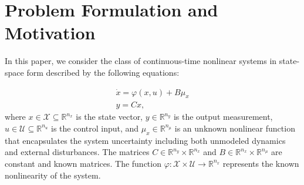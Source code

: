 \documentclass{ifacconf}
\begin{document}










\section{Problem Formulation and Motivation}\label{sec2}
%
In this paper, we consider the class of continuous-time nonlinear systems in state-space form described by the following equations:

\begin{equation}\label{sys_1}
    \begin{array}{l}
        \dot{x} = \varphi(x,u) + B\mu_{x}  \\
        y = Cx, 
    \end{array}
\end{equation}
where $x\in \mathcal{X} \subseteq\mathbb{R}^{n_x}$ is the state vector, $y\in\mathbb{R}^{n_y}$ is the output measurement, $u\in\mathcal{U} \subseteq\mathbb{R}^{n_u}$ is the control input, and $\mu_{x}\in\mathbb{R}^{n_{\mu}}$ is an unknown nonlinear function that encapsulates the system uncertainty including both unmodeled dynamics and external disturbances. The matrices $C\in\mathbb{R}^{n_y}\times\mathbb{R}^{n_x}$ and $B\in\mathbb{R}^{n_x}\times\mathbb{R}^{n_{\mu}}$ are constant and known matrices. The function $\varphi: \mathcal{X} \times \mathcal{U} \to \mathbb{R}^{n_x}$ represents the known nonlinearity of the system. 
\end{document}
